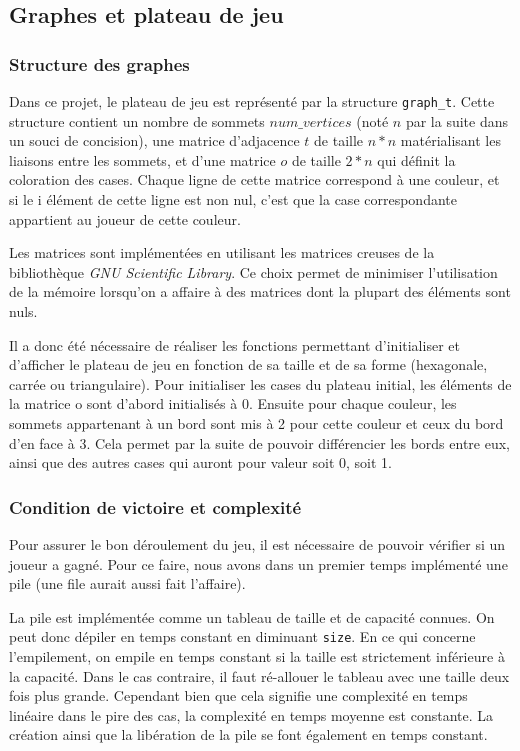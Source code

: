 \documentclass{article}
\begin{document}
\subsection{Graphes et plateau de jeu}

\subsubsection{Structure des graphes}

Dans ce projet, le plateau de jeu est représenté par la structure \lstinline{graph_t}. Cette structure contient un nombre de sommets $num\_vertices$ (noté $n$ par la suite dans un souci de concision), une matrice d'adjacence $t$ de taille $n*n$ matérialisant les liaisons entre les sommets, et d'une matrice $o$ de taille $2*n$ qui définit la coloration des cases. Chaque ligne de cette matrice correspond à une couleur, et si le i élément de cette ligne est non nul, c'est que la case correspondante appartient au joueur de cette couleur.

Les matrices sont implémentées en utilisant les matrices creuses de la bibliothèque \emph{GNU Scientific Library}. Ce choix permet de minimiser l'utilisation de la mémoire lorsqu'on a affaire à des matrices dont la plupart des éléments sont nuls.

Il a donc été nécessaire de réaliser les fonctions permettant d'initialiser et d'afficher le plateau de jeu en fonction de sa taille et de sa forme (hexagonale, carrée ou triangulaire). Pour initialiser les cases du plateau initial, les éléments de la matrice o sont d'abord initialisés à $0$. Ensuite pour chaque couleur, les sommets appartenant à un bord sont mis à 2 pour cette couleur et ceux du bord d'en face à 3. Cela permet par la suite de pouvoir différencier les bords entre eux, ainsi que des autres cases qui auront pour valeur soit 0, soit 1.


\subsubsection{Condition de victoire et complexité}

Pour assurer le bon déroulement du jeu, il est nécessaire de pouvoir vérifier si un joueur a gagné. Pour ce faire, nous avons dans un premier temps implémenté une pile (une file aurait aussi fait l'affaire).

La pile est implémentée comme un tableau de taille et de capacité connues. On peut donc dépiler en temps constant en diminuant \lstinline{size}. En ce qui concerne l'empilement, on empile en temps constant si la taille est strictement inférieure à la capacité. Dans le cas contraire, il faut ré-allouer le tableau avec une taille deux fois plus grande. Cependant bien que cela signifie une complexité en temps linéaire dans le pire des cas, la complexité en temps moyenne est constante. La création ainsi que la libération de la pile se font également en temps constant.
\end{document}
